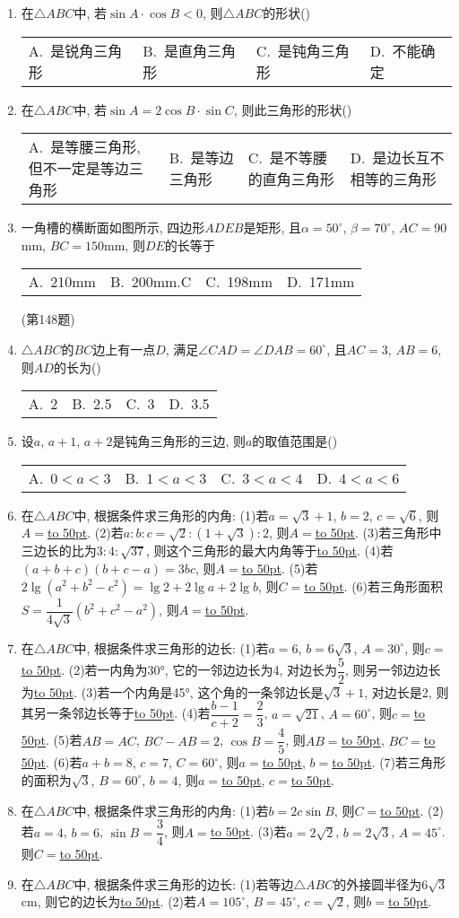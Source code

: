 \documentclass[10pt,a4paper]{article}
\newcommand{\blank}[1]{\underline{\hbox to #1pt{}}}
\newcommand{\fourch}[4]{\par\begin{tabular}{p{.23\textwidth}p{.23\textwidth}p{.23\textwidth}p{.23\textwidth}}
A.~#1 &B.~#2& C.~#3& D.~#4
\end{tabular}}
\begin{document}
\begin{enumerate}[1.]
\fourch{不等腰的锐角三角形}{直角三角形}{不等腰的钝角三角形}{等腰三角形}
\item 在$\triangle ABC$中, 若$\sin A\cdot \cos B<0$, 则$\triangle ABC$的形状()
\fourch{是锐角三角形}{是直角三角形}{是钝角三角形}{不能确定}
\item 在$\triangle ABC$中, 若$\sin A=2\cos B\cdot \sin C$, 则此三角形的形状()
\fourch{是等腰三角形, 但不一定是等边三角形}{是等边三角形}{是不等腰的直角三角形}{是边长互不相等的三角形}
\item 一角槽的横断面如图所示, 四边形$ADEB$是矩形, 且$\alpha =50^\circ$, $\beta =70^\circ$, $AC=90$mm, $BC=150$mm, 则$DE$的长等于
\fourch{210mm}{200mm.C}{198mm}{171mm}
(第148题)
\item $\triangle ABC$的$BC$边上有一点$D$, 满足$\angle CAD=\angle DAB=60^{\circ }$, 且$AC=3$, $AB=6$, 则$AD$的长为()
\fourch{2}{2.5}{3}{3.5}
\item 设$a$, $a+1$, $a+2$是钝角三角形的三边, 则$a$的取值范围是()
\fourch{$0<a<3$}{$1<a<3$}{$3<a<4$}{$4<a<6$}
\item 在$\triangle ABC$中, 根据条件求三角形的内角:
(1)若$a=\sqrt 3+1$, $b=2$, $c=\sqrt 6$, 则$A=$\blank{50}.
(2)若$a:b:c=\sqrt 2:(1+\sqrt 3):2$, 则$A=$\blank{50}.
(3)若三角形中三边长的比为$3:4:\sqrt {37}$, 则这个三角形的最大内角等于\blank{50}.
(4)若$(a+b+c)(b+c-a)=3bc$, 则$A=$\blank{50}.
(5)若$2\lg (a^2+b^2-c^2)=\lg 2+2\lg a+2\lg b$, 则$C=$\blank{50}.
(6)若三角形面积$S=\dfrac 1{4\sqrt 3}(b^2+c^2-a^2)$, 则$A=$\blank{50}.
\item 在$\triangle ABC$中, 根据条件求三角形的边长:
(1)若$a=6$, $b=6\sqrt 3$, $A=30^\circ$, 则$c=$\blank{50}.
(2)若一内角为30°, 它的一邻边边长为4, 对边长为$\dfrac 52$, 则另一邻边边长为\blank{50}.
(3)若一个内角是45°, 这个角的一条邻边长是$\sqrt 3+1$, 对边长是2, 则其另一条邻边长等于\blank{50}.
(4)若$\dfrac{b-1}{c+2}=\dfrac 23$, $a=\sqrt {21}$, $A=60^{\circ }$, 则$c=$\blank{50}.
(5)若$AB=AC$, $BC-AB=2$, $\cos B=\dfrac 45$, 则$AB=$\blank{50}, $BC=$\blank{50}.
(6)若$a+b=8$, $c=7$, $C=60^{\circ }$, 则$a=$\blank{50}, $b=$\blank{50}.
(7)若三角形的面积为$\sqrt 3$, $B=60^\circ$, $b=4$, 则$a=$\blank{50}, $c=$\blank{50}.
\item 在$\triangle ABC$中, 根据条件求三角形的内角:
(1)若$b=2c\sin B$, 则$C=$\blank{50}.
(2)若$a=4$, $b=6$, $\sin B=\dfrac 34$, 则$A=$\blank{50}.
(3)若$a=2\sqrt 2$, $b=2\sqrt 3$, $A=45^\circ$. 则$C=$\blank{50}.
\item 在$\triangle ABC$中, 根据条件求三角形的边长:
(1)若等边$\triangle ABC$的外接圆半径为$6\sqrt 3$cm, 则它的边长为\blank{50}.
(2)若$A=105^\circ$, $B=45^\circ$, $c=\sqrt 2$, 则$b=$\blank{50}.

\end{enumerate}
\end{document}
